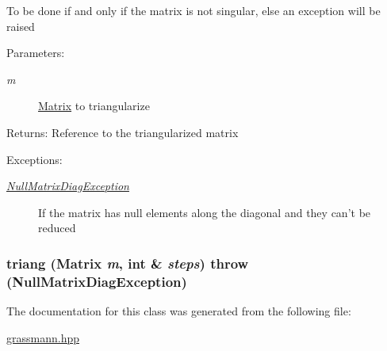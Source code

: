 To be done if and only if the matrix is not singular, else an exception will be raised \begin{Desc}
\item[Parameters:]
\begin{description}
\item[{\em m}]\hyperlink{classgrassmann_1_1Matrix}{Matrix} to triangularize \end{description}
\end{Desc}
\begin{Desc}
\item[Returns:]Reference to the triangularized matrix \end{Desc}
\begin{Desc}
\item[Exceptions:]
\begin{description}
\item[{\em \hyperlink{classgrassmann_1_1NullMatrixDiagException}{NullMatrixDiagException}}]If the matrix has null elements along the diagonal and they can't be reduced \end{description}
\end{Desc}
\hypertarget{classgrassmann_1_1Matrix_8f41e07e9806c67a29a10416a430f579}{
\subsubsection[triang]{ triang ({\bf Matrix} {\em m}, \/  int \& {\em steps})  throw ({\bf NullMatrixDiagException})}}
\label{classgrassmann_1_1Matrix_8f41e07e9806c67a29a10416a430f579}




The documentation for this class was generated from the following file:\begin{CompactItemize}
\item 
\hyperlink{grassmann_8hpp}{grassmann.hpp}\end{CompactItemize}
